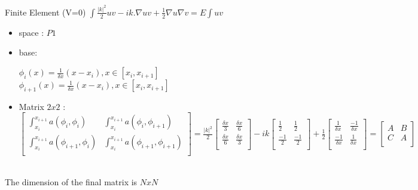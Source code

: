\documentclass{beamer}
\begin{document}
\begin{frame}{Finite Element (V=0)}
    $\int \frac{ |k|^2 }{2} u v - i  k. \nabla u v + \frac{1}{2} \nabla u \nabla v    = E \int  u v $ \\
    \begin{itemize}
        \item space : $P1$  \\
        \item base: 
            \begin{center}
                $\phi_{i}(x) = \frac{1}{\delta x} (x - x_i) , x \in [x_i,x_{i+1}]$ \\
                $ \phi_{i+1}(x) = \frac{1}{\delta x} (x - x_i) , x \in [x_i,x_{i+1}] $
            \end{center}
            
            
        \item  Matrix $2x2$ : \\ 
            $\begin{bmatrix}
            \int_{x_{i}}^{x_{i+1}} a(\phi_{i},\phi_{i}) &  
            \int_{x_{i}}^{x_{i+1}} a(\phi_{i},\phi_{i+1}) \\
            \int_{x_{i}}^{x_{i+1}} a(\phi_{i+1},\phi_{i}) &  
            \int_{x_{i}}^{x_{i+1}} a(\phi_{i+1},\phi_{i+1})\\
            \end{bmatrix}
            = \frac{ |k|^2 }{2} 
            \begin{bmatrix}
            \frac{\delta x}{3} &  \frac{\delta x}{6} \\
            \frac{\delta x}{6} &  \frac{\delta x}{3} \\
            \end{bmatrix} 
            - ik 
            \begin{bmatrix}
            \frac{1}{2} &  \frac{1}{2}  \\
            \frac{-1}{2}  &  \frac{-1}{2}  \\
            \end{bmatrix}
            + \frac{1}{2} 
            \begin{bmatrix}
            \frac{1}{\delta x} &  \frac{-1}{\delta x}  \\
            \frac{-1}{\delta x}  &  \frac{1}{\delta x}  \\
            \end{bmatrix} 
            =
            \begin{bmatrix}
            A &  B  \\
            C &  A  \\
            \end{bmatrix}$
    \end{itemize}
~~\\
The dimension of the final matrix is $NxN$ 
\end{frame}
\end{document}
